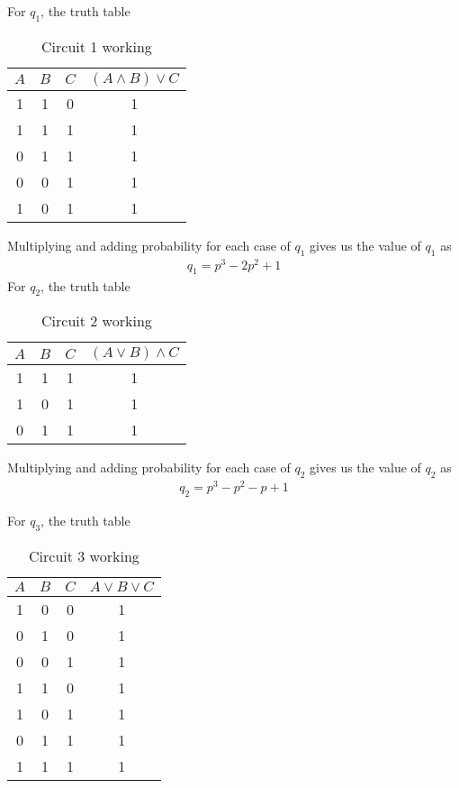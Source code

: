 \documentclass[journal,12pt,twocolumn]{IEEEtran}
\begin{document}
For $q_1$, the truth table

\begin{table}[h]
    \centering
    \begin{tabular}{|c|c|c|c|}
    \hline
         $A$ & $B$ & $C$ & $(A \land B) \lor C$ \\
         \hline
         1 &1  & 0 &1\\\hline
         1&1&1&1\\\hline
         0&1&1&1\\\hline
         0&0&1&1\\\hline
         1&0&1&1\\
    \hline
    \end{tabular}
    \caption{Circuit 1 working}
    \label{tab:my_label}
\end{table}

Multiplying and adding probability for each case of $q_1$ gives us the value of $q_1$ as
\begin{align}
    q_1 = p^3-2p^2+1
\end{align}
For $q_2$, the truth table
\begin{table}[h]
    \centering

    \begin{tabular}{|c|c|c|c|}
    \hline
         $A$ & $B$ & $C$ & $(A \lor B) \land C$ \\
         \hline
         1&1&1&1\\ \hline
         1&0&1&1\\\hline
         0&1&1&1\\
    \hline
    \end{tabular}
    \caption{Circuit 2 working}
    \label{tab:table2}
\end{table}

Multiplying and adding probability for each case of $q_2$ gives us the value of $q_2$ as
\begin{align}
    q_2 = p^3-p^2-p+1
\end{align}

For $q_3$, the truth table
\begin{table}[h]
    \centering
    \begin{tabular}{|c|c|c|c|}
    \hline
         $A$ & $B$ & $C$ & $A \lor B \lor C$ \\
         \hline
         1&0&0&1\\\hline
         0&1&0&1\\\hline
         0&0&1&1\\\hline
         1&1&0&1\\\hline
         1&0&1&1\\\hline
         0&1&1&1\\\hline
         1&1&1&1\\
    \hline
    \end{tabular}
    \caption{Circuit 3 working}
    \label{tab:table3}
\end{table}
\end{document}
